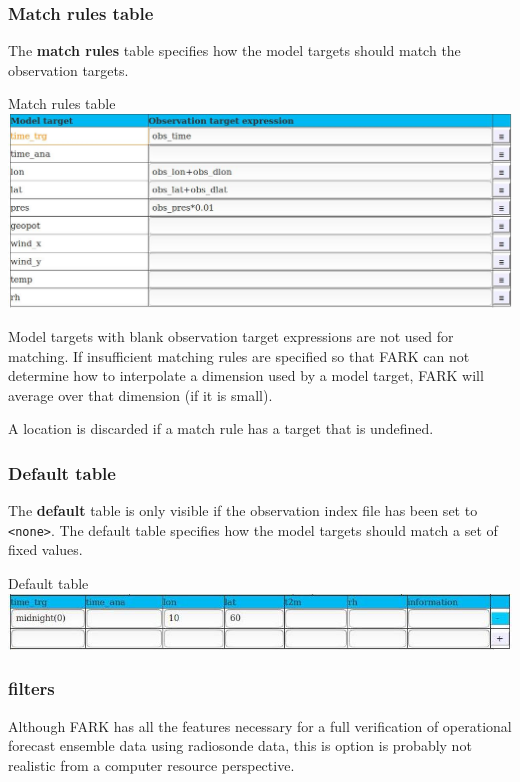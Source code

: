 \documentclass[letterpaper,10pt,twoside,twocolumn,openany]{book}
\begin{document}
\subsubsection{Match rules table}
The {\bf match rules} table specifies how the model targets should match the
observation targets. 
\begin{paperbox}{Match rules table}
  \includegraphics[width=\columnwidth]{coloc_match.jpg}
\end{paperbox}
Model targets with blank observation target expressions are not used for matching.
If insufficient matching rules are specified so that FARK can not determine how to
interpolate a dimension used by a model target, FARK will average over that dimension (if it is small).

\begin{quotebox}
A location is discarded if a match rule has a target that is undefined.
\end{quotebox}

\hypertarget{default}{}
\subsubsection{Default table}
The {\bf default} table is only visible if the observation index file has been set to \lstinline!<none>!.
The default table specifies how the model targets should match a set of fixed values.
\begin{paperbox}{Default table}
  \includegraphics[width=\columnwidth]{default.jpg}
\end{paperbox}

\subsubsection{filters}

Although FARK has all the features necessary for a full verification of
operational forecast ensemble data using radiosonde data, this is option is
probably not realistic from a computer resource perspective.
\end{document}
